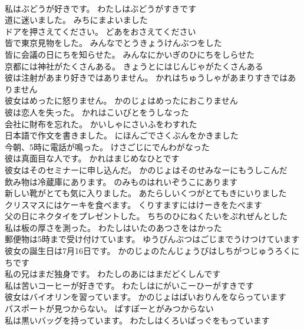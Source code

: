 \documentclass[8pt]{extreport}
\begin{document}
\begin{CJK}{UTF8}{min}
\\	私はぶどうが好きです。	わたしはぶどうがすきです 
\\	道に迷いました。	みちにまよいました 
\\	ドアを押さえてください。	どあをおさえてください 
\\	皆で東京見物をした。	みんなでとうきょうけんぶつをした 
\\	皆に会議の日にちを知らせた。	みんなにかいぎのひにちをしらせた 
\\	京都には神社がたくさんある。	きょうとにはじんじゃがたくさんある 
\\	彼は注射があまり好きではありません。	かれはちゅうしゃがあまりすきではありません 
\\	彼女はめったに怒りません。	かのじょはめったにおこりません 
\\	彼は恋人を失った。	かれはこいびとをうしなった 
\\	会社に財布を忘れた。	かいしゃにさいふをわすれた 
\\	日本語で作文を書きました。	にほんごでさくぶんをかきました 
\\	今朝、5時に電話が鳴った。	けさごじにでんわがなった 
\\	彼は真面目な人です。	かれはまじめなひとです 
\\	彼女はそのセミナーに申し込んだ。	かのじょはそのせみなーにもうしこんだ 
\\	飲み物は冷蔵庫にあります。	のみものはれいぞうこにあります 
\\	新しい靴がとても気に入りました。	あたらしいくつがとてもきにいりました 
\\	クリスマスにはケーキを食べます。	くりすますにはけーきをたべます 
\\	父の日にネクタイをプレゼントした。	ちちのひにねくたいをぷれぜんとした 
\\	私は板の厚さを測った。	わたしはいたのあつさをはかった 
\\	郵便物は5時まで受け付けています。	ゆうびんぶつはごじまでうけつけています 
\\	彼女の誕生日は7月16日です。	かのじょのたんじょうびはしちがつじゅうろくにちです 
\\	私の兄はまだ独身です。	わたしのあにはまだどくしんです 
\\	私は苦いコーヒーが好きです。	わたしはにがいこーひーがすきです 
\\	彼女はバイオリンを習っています。	かのじょはばいおりんをならっています 
\\	パスポートが見つからない。	ぱすぽーとがみつからない 
\\	私は黒いバッグを持っています。	わたしはくろいばっぐをもっています 

\end{CJK}
\end{document}

